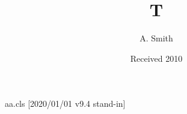 \begin{filecontents*}[overwrite]{aa.cls}
[2020/01/01 v9.4 stand-in]
\def\institute#1{\gdef\@institute{#1}}\def\@institute{}
\newcommand*\mail[1]{\renewcommand*\aa@mail{#1}}\newcommand*\aa@mail{}
\def\@maketitle{{\Large\@title\par}\@author\par\@institute\par}
\end{filecontents*}
\documentclass{aa}

\title{T}\author{A. Smith}\date{Received 2010}
\maketitle
Body.

